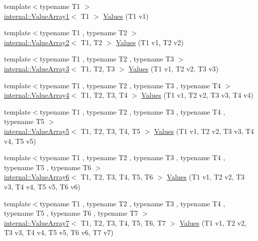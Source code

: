 \begin{DoxyCompactItemize}
{\footnotesize template$<$typename T1 $>$ }\\\hyperlink{classtesting_1_1internal_1_1ValueArray1}{internal\-::\-Value\-Array1}$<$ \-T1 $>$ \hyperlink{namespacetesting_a8209ef59db08b8ad4beed30d8d6e6a88}{\-Values} (\-T1 v1)
\item 
{\footnotesize template$<$typename T1 , typename T2 $>$ }\\\hyperlink{classtesting_1_1internal_1_1ValueArray2}{internal\-::\-Value\-Array2}$<$ \-T1, \-T2 $>$ \hyperlink{namespacetesting_a7cfec131dd8773430fb87483509cc6d0}{\-Values} (\-T1 v1, \-T2 v2)
\item 
{\footnotesize template$<$typename T1 , typename T2 , typename T3 $>$ }\\\hyperlink{classtesting_1_1internal_1_1ValueArray3}{internal\-::\-Value\-Array3}$<$ \-T1, \-T2, \-T3 $>$ \hyperlink{namespacetesting_a344ca3522cb99a7b98801a9577993011}{\-Values} (\-T1 v1, \-T2 v2, \-T3 v3)
\item 
{\footnotesize template$<$typename T1 , typename T2 , typename T3 , typename T4 $>$ }\\\hyperlink{classtesting_1_1internal_1_1ValueArray4}{internal\-::\-Value\-Array4}$<$ \-T1, \-T2, \*
\-T3, \-T4 $>$ \hyperlink{namespacetesting_a4b14d4b6e471a1fb8ee3e5706dbc11c6}{\-Values} (\-T1 v1, \-T2 v2, \-T3 v3, \-T4 v4)
\item 
{\footnotesize template$<$typename T1 , typename T2 , typename T3 , typename T4 , typename T5 $>$ }\\\hyperlink{classtesting_1_1internal_1_1ValueArray5}{internal\-::\-Value\-Array5}$<$ \-T1, \-T2, \*
\-T3, \-T4, \-T5 $>$ \hyperlink{namespacetesting_aa2c5f97a44a14ae95da8313b115b6396}{\-Values} (\-T1 v1, \-T2 v2, \-T3 v3, \-T4 v4, \-T5 v5)
\item 
{\footnotesize template$<$typename T1 , typename T2 , typename T3 , typename T4 , typename T5 , typename T6 $>$ }\\\hyperlink{classtesting_1_1internal_1_1ValueArray6}{internal\-::\-Value\-Array6}$<$ \-T1, \-T2, \*
\-T3, \-T4, \-T5, \-T6 $>$ \hyperlink{namespacetesting_a552772c4c4daa68b5e995e0d64651150}{\-Values} (\-T1 v1, \-T2 v2, \-T3 v3, \-T4 v4, \-T5 v5, \-T6 v6)
\item 
{\footnotesize template$<$typename T1 , typename T2 , typename T3 , typename T4 , typename T5 , typename T6 , typename T7 $>$ }\\\hyperlink{classtesting_1_1internal_1_1ValueArray7}{internal\-::\-Value\-Array7}$<$ \-T1, \-T2, \*
\-T3, \-T4, \-T5, \-T6, \-T7 $>$ \hyperlink{namespacetesting_a8fe9ae088304ebc64de1b076951e6eb8}{\-Values} (\-T1 v1, \-T2 v2, \-T3 v3, \-T4 v4, \-T5 v5, \-T6 v6, \-T7 v7)

\end{DoxyCompactItemize}
